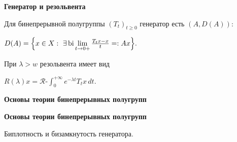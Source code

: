 \documentclass[11pt]{article}
\begin{document}
\begin{center}
{\color{notaeYELLOW}\bfseries\fontsize{44}{52}\selectfont Генератор и резольвента}
\end{center}
\vspace*{\fill}
\begin{center}
\fontsize{36}{43}\selectfont
\parbox{\linewidth}{\centering\noindent Для бинепрерывной полугруппы $(T_t)_{t\ge0}$ генератор есть $(A,D(A))$:
\par}\vspace{0.4in}
\parbox{\linewidth}{\centering\noindent $D(A)=\Bigl\{x\in X:\ \exists\operatorname{bi}\lim\limits_{t\to0+}\frac{T_t x-x}{t}=:Ax\Bigr\}.$
\par}\vspace{0.4in}
\parbox{\linewidth}{\centering\noindent При $\lambda>w$ резольвента имеет вид
\par}\vspace{0.4in}
\parbox{\linewidth}{\centering\noindent $R(\lambda)x=\mathcal{R}\text{-}\int_0^{+\infty}e^{-\lambda t}T_t x\,dt.$
\par}\vspace{0.4in}
\end{center}
\vspace*{\fill}

\newpage

\begin{center}
{\color{notaeYELLOW}\bfseries\fontsize{44}{52}\selectfont Основы теории бинепрерывных полугрупп}
\end{center}
\vspace*{\fill}
\begin{center}
\fontsize{36}{43}\selectfont
\end{center}
\vspace*{\fill}

\newpage

\begin{center}
{\color{notaeYELLOW}\bfseries\fontsize{44}{52}\selectfont Основы теории бинепрерывных полугрупп}
\end{center}
\vspace*{\fill}
\begin{center}
\fontsize{36}{43}\selectfont
\parbox{\linewidth}{\centering\noindent Биплотность и бизамкнутость генератора.
\par}\vspace{0.4in}
\end{center}
\vspace*{\fill}

\newpage
\end{document}
